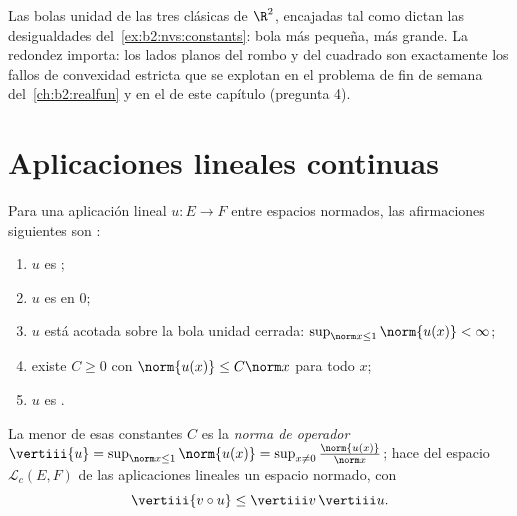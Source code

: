 \begin{omfigure}

{\small Las bolas unidad de las tres  clásicas de $\R^2$,
encajadas tal como dictan las desigualdades del~\cref{ex:b2:nvs:constants}: bola más pequeña,  más grande. La
redondez importa: los lados planos del rombo y del cuadrado son
exactamente los fallos de convexidad estricta que se explotan en el
problema de fin de semana del~\cref{ch:b2:realfun} y en el de este
capítulo (pregunta 4).}
\end{omfigure}

\section{Aplicaciones lineales continuas}

\begin{theorem}[Caracterización]\label{thm:b2:nvs:continuouslinear}
Para una aplicación lineal $u \colon E \to F$ entre espacios
normados, las afirmaciones siguientes son :
\begin{enumerate}
  \item $u$ es ;
  \item $u$ es  en $0$;
  \item $u$ está acotada sobre la bola unidad cerrada: $\sup_{\norm
        x \leq 1} \norm{u(x)} < \infty$;
  \item existe $C \geq 0$ con $\norm{u(x)} \leq C \norm x$ para todo
        $x$;
  \item $u$ es .
\end{enumerate}
La menor de esas constantes $C$ es la \emph{norma de
operador} $\vertiii{u} = \sup_{\norm x \leq
1}\norm{u(x)} = \sup_{x \neq 0} \frac{\norm{u(x)}}{\norm x}$; hace
del espacio $\mathcal{L}_c(E, F)$ de las aplicaciones lineales
 un espacio normado, con
\[
\vertiii{v \circ u} \leq \vertiii v\, \vertiii u .
\]
\end{theorem}

